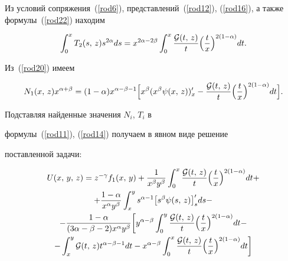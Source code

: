 Из условий сопряжения~(\ref{rod6}), представлений~(\ref{rod12}), (\ref{rod16}), а также формулы~(\ref{rod22}) находим

\begin{equation}

\int _0^xT_2(s,\,z)s^{2\alpha}ds=x^{2\alpha-2\beta}\int _0^x\frac{{\cal

G}(t,\,z)}{t} \Bigl(\frac{t}{x}\Bigr)^{2(1-\alpha)}dt.

\label{rod23}

\end{equation}

Из~(\ref{rod20}) имеем

\begin{equation}

N_1(x,\,z)x^{\alpha+\beta}=(1-\alpha)x^{\alpha-\beta-1}\Bigl[x^\beta(x^\beta\psi(x,\,z))'_x-

\frac{{\cal G}(t,\,z)}{t}

\Bigl(\frac{t}{x}\Bigr)^{2(1-\alpha)}dt\Bigr]. \label{rod24}

\end{equation}



Подставляя найденные значения $N_i$, $T_i$ в

формулы~(\ref{rod11}), (\ref{rod14}) получаем в явном виде решение

поставленной задачи:

\begin{multline}

U(x,\,y,\,z)=z^{-\gamma}f_1(x,\,y)+\frac{1}{x^\beta y^\beta}

\int _0^x\frac{{\cal G}(t,\,z)}{t} \Bigl(\frac{t}{x}\Bigr)^{2(1-\alpha)}dt+\label{rod25}\\

+ \frac{1-\alpha}{x^\alpha y^\beta}\int _x^ys^{\alpha-1}\bigl[s^\beta\psi(s,\,z)\bigr]'_sds- \\

-

\frac{1-\alpha}{(3\alpha-\beta-2)x^\alpha y^\beta}

\biggl[y^{\alpha-\beta}\int _0^y\frac{{\cal G}(t,\,z)}{t} \Bigl(\frac{t}{x}\Bigr)^{2(1-\alpha)}dt-\\

- \int _x^y{\cal

G}(t,\,z)t^{\alpha-\beta-1}dt-x^{\alpha-\beta}\int _0^x\frac{{\cal

G}(t,\,z)}{t} \Bigl(\frac{t}{x}\Bigr)^{2(1-\alpha)}dt\biggr]

\end{multline}

